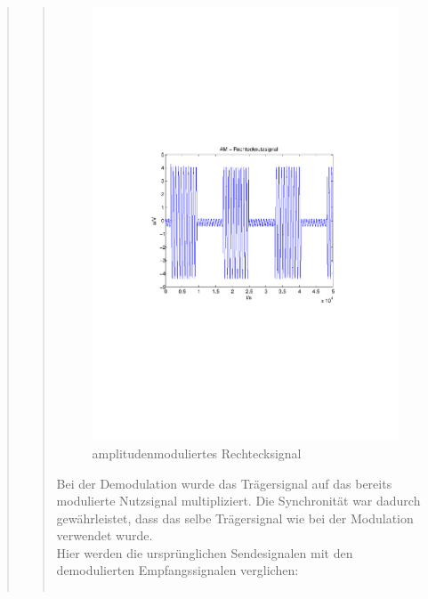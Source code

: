 \begin{quote}
\begin{quote}
             \begin{figure}[H] \centering
                    \includegraphics[scale=0.5, trim = 2cm 6.5cm 1.5cm 8.5cm,
                    clip]{./Bilder/am-rechteck}
                        \caption{amplitudenmoduliertes Rechtecksignal}
                \end{figure}
        
        
        
        Bei der Demodulation wurde das Trägersignal auf das
        bereits modulierte Nutzsignal multipliziert. Die Synchronität war
        dadurch gewährleistet, dass das selbe Trägersignal wie bei der
        Modulation verwendet wurde.\\
        Hier werden die ursprünglichen Sendesignalen mit den
        demodulierten Empfangssignalen verglichen:
        
                \begin{center}
            \begin{tabular}{ll}


\end{tabular}
\end{center}
\end{quote}
\end{quote}
